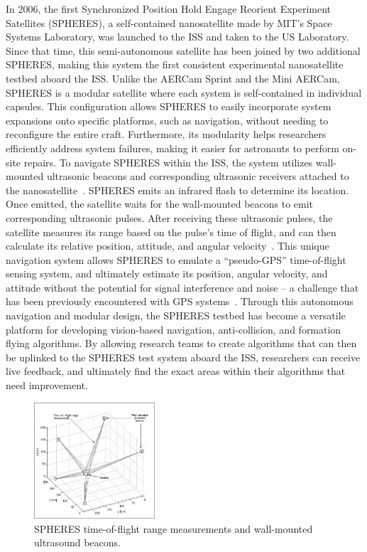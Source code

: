 \documentclass[journal, 10pt]{IEEEtran}
\begin{document}
In 2006, the first Synchronized Position Hold Engage Reorient Experiment Satellites (SPHERES), a self-contained nanosatellite made by MIT's Space Systems Laboratory, was launched to the ISS and taken to the US Laboratory. Since that time, this semi-autonomous satellite has been joined by two additional SPHERES, making this system the first consistent experimental nanosatellite testbed aboard the ISS. Unlike the AERCam Sprint and the Mini AERCam, SPHERES is a modular satellite where each system is self-contained in individual capsules. This configuration allows SPHERES to easily incorporate system expansions onto specific platforms, such as navigation, without needing to reconfigure the entire craft. Furthermore, its modularity helps researchers efficiently address system failures, making it easier for astronauts to perform on-site repairs. To navigate SPHERES within the ISS, the system utilizes wall-mounted ultrasonic beacons and corresponding ultrasonic receivers attached to the nanosatellite~\cite{SPHERES}. SPHERES emits an infrared flash to determine its location. Once emitted, the satellite waits for the wall-mounted beacons to emit corresponding ultrasonic pulses. After receiving these ultrasonic pulses, the satellite measures its range based on the pulse's time of flight, and can then calculate its relative position, attitude, and angular velocity~\cite{SPHERES, Vertigo1}. This unique navigation system allows SPHERES to emulate a ``pseudo-GPS'' time-of-flight sensing system, and ultimately estimate its position, angular velocity, and attitude without the potential for signal interference and noise -- a challenge that has been previously encountered with GPS systems~\cite{Vertigo1}. Through this autonomous navigation and modular design, the SPHERES testbed has become a versatile platform for developing vision-based navigation, anti-collision, and formation flying algorithms. By allowing research teams to create algorithms that can then be uplinked to the SPHERES test system aboard the ISS, researchers can receive live feedback, and ultimately find the exact areas within their algorithms that need improvement.

\begin{figure}[tb]
\begin{center}
\includegraphics[width=0.4\textwidth]{figures/Spheres_Auto10.pdf}
\caption{SPHERES time-of-flight range measurements and wall-mounted ultrasound beacons.}
\label{spheres_plot}
\end{center}
\end{figure}
\end{document}
